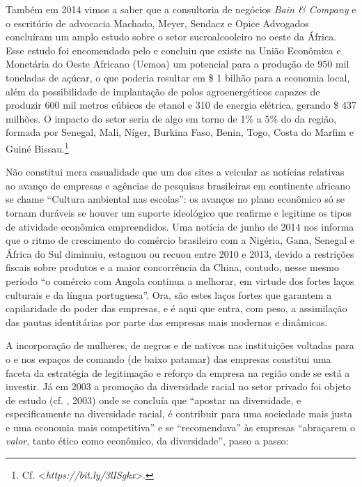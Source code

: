 Também em 2014 vimos a saber que a consultoria de negócios \emph{Bain \&
Company} e o escritório de advocacia Machado, Meyer, Sendacz e Opice
Advogados concluíram um amplo estudo sobre o setor sucroalcooleiro no
oeste da África. Esse estudo foi encomendado pelo  e concluiu que
existe na União Econômica e Monetária do Oeste Africano (Uemoa) um
potencial para a produção de 950 mil toneladas de açúcar, o que poderia
resultar em \$ 1 bilhão para a economia local, além da possibilidade
de implantação de polos agroenergéticos capazes de produzir 600 mil
metros cúbicos de etanol e 310  de energia elétrica, gerando \$ 437
milhões. O impacto do setor seria de algo em torno de 1\% a 5\% do 
da região, formada por Senegal, Mali, Níger, Burkina Faso, Benin, Togo,
Costa do Marfim e Guiné Bissau.\footnote{Cf.
  \textless{}\emph{https://bit.ly/3lISgkx}\textgreater{}.}

Não constitui mera casualidade que um dos sites a veicular as notícias
relativas ao avanço de empresas e agências de pesquisas brasileiras em
continente africano se chame ``Cultura ambiental nas escolas'': os
avanços no plano econômico só se tornam duráveis se houver um suporte
ideológico que reafirme e legitime os tipos de atividade econômica
empreendidos. Uma notícia de junho de 2014 nos informa que o ritmo de
crescimento do comércio brasileiro com a Nigéria, Gana, Senegal e África
do Sul diminuiu, estagnou ou recuou entre 2010 e 2013, devido a
restrições fiscais sobre produtos e a maior concorrência da China,
contudo, nesse mesmo período ``o comércio com Angola continua a
melhorar, em virtude dos fortes laços culturais e da língua
portuguesa''. Ora, são estes laços fortes que garantem a capilaridade do
poder das empresas, e é aqui que entra, com peso, a assimilação das
pautas identitárias por parte das empresas mais modernas e dinâmicas.

A incorporação de mulheres, de negros e de nativos nas instituições
voltadas para o  e nos espaços de comando (de baixo patamar) das
empresas constitui uma faceta da estratégia de legitimação e reforço da
empresa na região onde se está a investir. Já em 2003 a promoção da
diversidade racial no setor privado foi objeto de estudo (cf. ,
2003) onde se concluía que ``apostar na diversidade, e especificamente
na diversidade racial, é contribuir para uma sociedade mais justa e uma
economia mais competitiva'' e se ``recomendava'' às empresas ``abraçarem
o \emph{valor}, tanto ético como econômico, da diversidade'', passo a
passo:

